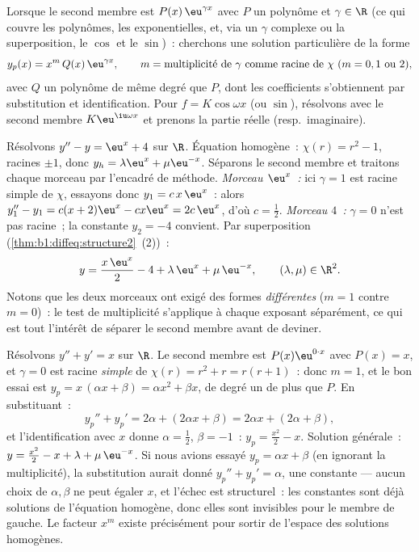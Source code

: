\begin{method}[Solution particulière pour $f(x) = P(x)\,\eu^{\gamma x}$]\label{met:b1:diffeq:particular}
Lorsque le second membre est $P(x)\,\eu^{\gamma x}$ avec $P$ un
polynôme et $\gamma \in \R$ (ce qui couvre les polynômes, les
exponentielles, et, via un $\gamma$ complexe ou la superposition, le
$\cos$ et le $\sin$)~: cherchons une solution particulière de la forme
\[
y_p(x) = x^{m}\, Q(x)\, \eu^{\gamma x},
\qquad
m = \text{multiplicité de } \gamma \text{ comme racine de } \chi
\ (m = 0, 1 \text{ ou } 2),
\]
avec $Q$ un polynôme de même degré que $P$, dont les coefficients
s'obtiennent par substitution et identification. Pour $f = K\cos\omega
x$ (ou $\sin$), résolvons avec le second membre $K\eu^{\iu\omega x}$
et prenons la partie réelle (resp.\ imaginaire).
\end{method}

\begin{example}\label{ex:b1:diffeq:superposition}
Résolvons $y'' - y = \eu^{x} + 4$ sur $\R$. Équation homogène~:
$\chi(r) = r^2 - 1$, racines $\pm1$, donc $y_h = \lambda\eu^x +
\mu\eu^{-x}$. Séparons le second membre et traitons chaque morceau par
l'encadré de méthode. \emph{Morceau $\eu^x$~:} ici $\gamma = 1$ est
racine simple de $\chi$, essayons donc $y_1 = c\,x\,\eu^x$~: alors
$y_1'' - y_1 = c(x + 2)\eu^x - cx\eu^x = 2c\,\eu^x$, d'où $c =
\frac12$. \emph{Morceau $4$~:} $\gamma = 0$ n'est pas racine~; la
constante $y_2 = -4$ convient. Par superposition
(\cref{thm:b1:diffeq:structure2}~(2))~:
\[
y = \frac{x\,\eu^x}2 - 4 + \lambda\,\eu^x + \mu\,\eu^{-x},
\qquad (\lambda, \mu) \in \R^2 .
\]
Notons que les deux morceaux ont exigé des formes \emph{différentes}
($m = 1$ contre $m = 0$)~: le test de multiplicité s'applique à chaque
exposant séparément, ce qui est tout l'intérêt de séparer le second
membre avant de deviner.
\end{example}

\begin{example}\label{ex:b1:diffeq:multiplicity}
Résolvons $y'' + y' = x$ sur $\R$. Le second membre est
$P(x)\eu^{0\cdot x}$ avec $P(x) = x$, et $\gamma = 0$ est racine
\emph{simple} de $\chi(r) = r^2 + r = r(r + 1)$~: donc $m = 1$, et le
bon essai est $y_p = x\,(\alpha x + \beta) = \alpha x^2 + \beta x$, de
degré un de plus que $P$. En substituant~:
\[
y_p'' + y_p' = 2\alpha + (2\alpha x + \beta)
= 2\alpha x + (2\alpha + \beta) ,
\]
et l'identification avec $x$ donne $\alpha = \frac12$, $\beta = -1$~:
$y_p = \frac{x^2}2 - x$. Solution générale~: $y = \frac{x^2}2 - x +
\lambda + \mu\,\eu^{-x}$. Si nous avions essayé $y_p = \alpha x +
\beta$ (en ignorant la multiplicité), la substitution aurait donné
$y_p'' + y_p' = \alpha$, une constante --- aucun choix de $\alpha,
\beta$ ne peut égaler $x$, et l'échec est structurel~: les constantes
sont déjà solutions de l'équation homogène, donc elles sont invisibles
pour le membre de gauche. Le facteur $x^m$ existe précisément pour
sortir de l'espace des solutions homogènes.
\end{example}

